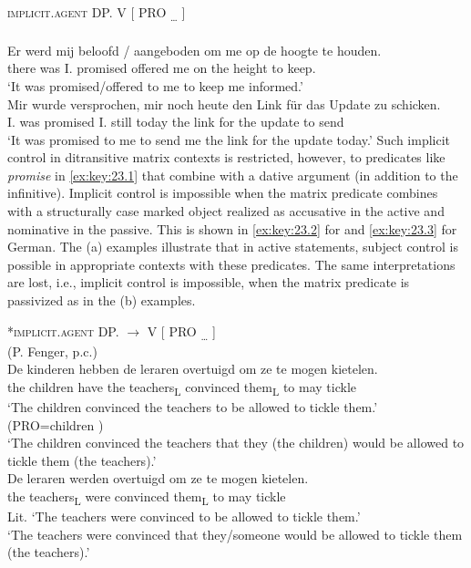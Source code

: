 \documentclass[output=paper]{langsci/langscibook}
\begin{document}
\ea\label{ex:key:23.1}
    \textsc{implicit.agent}  DP.\Dat{}  V  [\textsubscript{\Inf{}}  PRO\textsubscript{ …}  ]\\
    \ea\label{ex:key:23.1a}  \parencite[171, (8)]{vanUrk2013}\\
		\gll Er  werd  mij  beloofd / aangeboden  om  me  op de hoogte  te houden.\\
                there  was  I.\Dat{}  promised {} offered  \Comp{}  me  on the height  to keep.\textsc{\Inf{}}\\
		\glt ‘It was promised/offered to me to keep me informed.’
    \ex\label{ex:key:23.1b}  \parencite[171, (9a)]{vanUrk2013}\\
		\gll Mir  wurde  versprochen,  mir  noch heute  den Link für das Update  zu schicken.\\
			I.\Dat{}  was  promised  I.\Dat{}  still today  the link for the update  to send\\
		\glt ‘It was promised to me to send me the link for the update today.’
	\z
\z
%
Such implicit control in ditransitive matrix contexts is restricted, however,
to predicates like \emph{promise} in \eqref{ex:key:23.1} that combine with a dative argument
(in addition to the infinitive). Implicit control is impossible when the matrix
predicate combines with a structurally case marked object realized as
accusative in the active and nominative in the passive.
This is shown in \eqref{ex:key:23.2} for  and \eqref{ex:key:23.3} for German. The (a) examples
illustrate that in active statements, subject control is possible in
appropriate contexts with these predicates. The same interpretations are lost,
i.e., implicit control is impossible, when the matrix predicate is passivized
as in the (b) examples.

\ea\label{ex:key:23.2} *\textsc{implicit.agent}  DP.\Acc{} $\to$ \Nom{}  V  [\textsubscript{\Inf{}}   PRO \textsubscript{ …}  ]\\
	\ea\label{ex:key:23.2a}  (P. Fenger, p.c.)\\
    \gll De kinderen  hebben  de leraren  overtuigd  om  ze  te mogen  kietelen.\\
		the children  have  the teachers\textsubscript{L}  convinced  \Comp{}  them\textsubscript{L}  to may  tickle\\
	\glt ‘The children convinced the teachers to be allowed to tickle them.’ (PRO=children )\\
		‘The children convinced the teachers that they (the children) would
    be allowed to tickle them (the teachers).’\newpage
    \ex\label{ex:key:23.2b}  \parencite[171, (10b)]{vanUrk2013}\\
    \gll \llap{*}De leraren  werden overtuigd  om ze  te mogen kietelen.\\
		the teachers\textsubscript{L}  were  convinced  \Comp{}  them\textsubscript{L}  to may  tickle\\
	\glt Lit. ‘The teachers were convinced to be allowed to tickle them.’\\
			‘The teachers were convinced that they/someone would be allowed to tickle them (the teachers).’
	\z
\z
\end{document}
